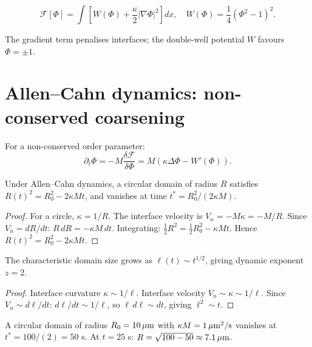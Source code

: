 \begin{definition}
  \label{def:gradient-energy}
  \[
    \mathcal{F}[\Phi]
    = \int\left[W(\Phi) + \frac{\kappa}{2}|\nabla\Phi|^2\right]dx,
    \quad W(\Phi) = \frac{1}{4}(\Phi^2-1)^2.
  \]
\end{definition}

The gradient term penalises interfaces; the double-well
potential $W$ favours $\Phi = \pm 1$.

\section{Allen--Cahn dynamics: non-conserved coarsening}

\begin{definition}
  For a non-conserved order parameter:
  \[
    \partial_t\Phi = -M\frac{\delta\mathcal{F}}{\delta\Phi}
    = M(\kappa\Delta\Phi - W'(\Phi)).
  \]
\end{definition}

\begin{theorem}
  \label{thm:shrinking-circle}
  \statusproven{}
  Under Allen--Cahn dynamics, a circular domain of radius $R$
  satisfies $R(t)^2 = R_0^2 - 2\kappa M t$, and vanishes at
  time $t^* = R_0^2/(2\kappa M)$.
\end{theorem}

\begin{proof}
  For a circle, $\kappa = 1/R$.
  The interface velocity is $V_n = -M\kappa = -M/R$.
  Since $V_n = dR/dt$:
  $R\,dR = -\kappa M\,dt$.
  Integrating: $\frac{1}{2}R^2 = \frac{1}{2}R_0^2 - \kappa M t$.
  Hence $R(t)^2 = R_0^2 - 2\kappa M t$.
\end{proof}

\begin{theorem}
  \label{thm:ac-exponent}
  \statusproven{}
  The characteristic domain size grows as $\ell(t) \sim t^{1/2}$,
  giving dynamic exponent $z = 2$.
\end{theorem}

\begin{proof}
  Interface curvature $\kappa \sim 1/\ell$.
  Interface velocity $V_n \sim \kappa \sim 1/\ell$.
  Since $V_n \sim d\ell/dt$: $d\ell/dt \sim 1/\ell$,
  so $\ell\,d\ell \sim dt$, giving $\ell^2 \sim t$.
\end{proof}

\begin{WorkedExample}
  A circular domain of radius $R_0 = 10\,\mu{\rm m}$
  with $\kappa M = 1\,\mu{\rm m}^2/{\rm s}$ vanishes at
  $t^* = 100/(2) = 50$ s.
  At $t = 25$ s: $R = \sqrt{100 - 50} \approx 7.1\,\mu{\rm m}$.
\end{WorkedExample}

